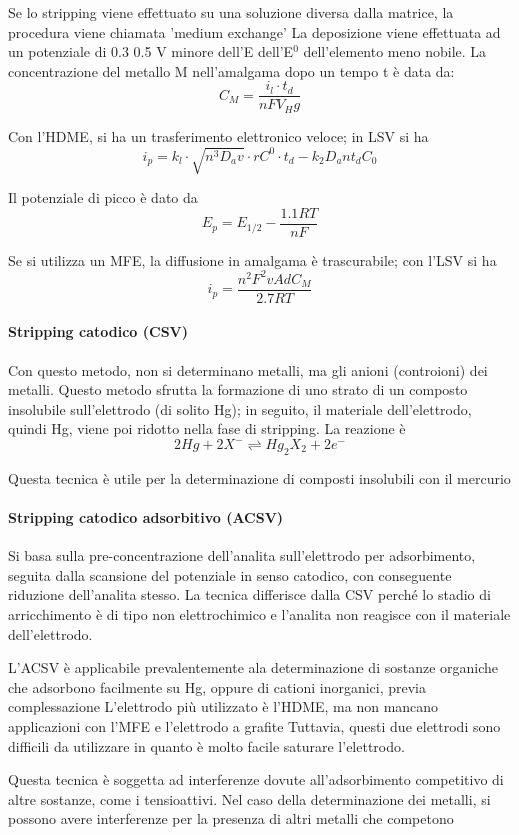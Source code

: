 Se lo stripping viene effettuato su una soluzione diversa dalla matrice, la procedura viene chiamata 'medium exchange'
La deposizione viene effettuata ad un potenziale di 0.3 0.5 V minore dell'E dell'E$^0$ dell'elemento meno nobile.
La concentrazione del metallo M nell'amalgama dopo un tempo t è data da:
\[
C_M = \frac{i_l \cdot t_d}{n F V_Hg}
\]

Con l'HDME, si ha un trasferimento elettronico veloce; in LSV si ha
\[
i_p = k_l \cdot \sqrt{n^3 D_a v} \cdot r C^0 \cdot t_d - k_2 D_a n t_d C_0
\]

Il potenziale di picco è dato da
\[
E_p = E_{1/2} - \frac{1.1 RT}{nF}
\]

Se si utilizza un MFE, la diffusione in amalgama è trascurabile; con l'LSV si ha
\[
i_p = \frac{n^2 F^2 v A d C_M}{2.7 RT}
\]

\paragraph{Stripping catodico (CSV)}
Con questo metodo, non si determinano metalli, ma gli anioni (controioni) dei metalli.
Questo metodo sfrutta la formazione di uno strato di un composto insolubile sull'elettrodo (di solito Hg);
in seguito, il materiale dell'elettrodo, quindi Hg, viene poi ridotto nella fase di stripping.
La reazione è
\[
2 Hg + 2 X^- \rightleftharpoons Hg_2X_2 + 2 e^-
\]

Questa tecnica è utile per la determinazione di composti insolubili con il mercurio

\paragraph{Stripping catodico adsorbitivo (ACSV)}
Si basa sulla pre-concentrazione dell'analita sull'elettrodo per adsorbimento, seguita dalla scansione del potenziale in senso catodico, con conseguente riduzione dell'analita stesso.
La tecnica differisce dalla CSV perché lo stadio di arricchimento è di tipo non elettrochimico e l'analita non reagisce con il materiale dell'elettrodo.

L'ACSV è applicabile prevalentemente ala determinazione di sostanze organiche che adsorbono facilmente su Hg, oppure di cationi inorganici, previa complessazione
L'elettrodo più utilizzato è l'HDME, ma non mancano applicazioni con l'MFE e l'elettrodo a grafite
Tuttavia, questi due elettrodi sono difficili da utilizzare in quanto è molto facile saturare l'elettrodo.

Questa tecnica è soggetta ad interferenze dovute all'adsorbimento competitivo di altre sostanze, come i tensioattivi.
Nel caso della determinazione dei metalli, si possono avere interferenze per la presenza di altri metalli che competono

